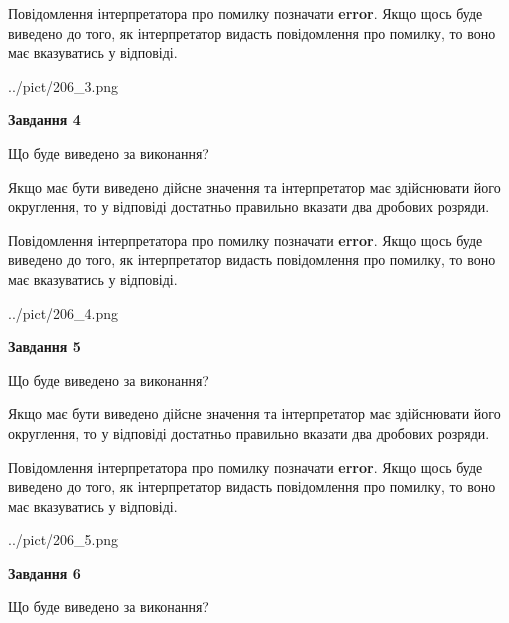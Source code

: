 \documentclass[12pt, ukrainian]{article}
\begin{document}
{\begin {Large}
Повідомлення інтерпретатора про помилку позначати \textbf{error}.
Якщо щось буде виведено до того, як інтерпретатор видасть повідомлення про помилку, 
то воно має вказуватись у відповіді. \par

\begin{center}
	{../pict/206_3.png}
\end{center}
\newpage

{\begin {center}\textbf{Завдання 4}\end {center}}\par
Що буде виведено за виконання? \par

Якщо має бути виведено дійсне значення та інтерпретатор має здійснювати його округлення, 
то у відповіді достатньо правильно вказати два дробових розряди.

Повідомлення інтерпретатора про помилку позначати \textbf{error}.
Якщо щось буде виведено до того, як інтерпретатор видасть повідомлення про помилку, 
то воно має вказуватись у відповіді. \par

\begin{center}
	{../pict/206_4.png}
\end{center}
\newpage

{\begin {center}\textbf{Завдання 5}\end {center}}\par
Що буде виведено за виконання? \par

Якщо має бути виведено дійсне значення та інтерпретатор має здійснювати його округлення, 
то у відповіді достатньо правильно вказати два дробових розряди.

Повідомлення інтерпретатора про помилку позначати \textbf{error}.
Якщо щось буде виведено до того, як інтерпретатор видасть повідомлення про помилку, 
то воно має вказуватись у відповіді. \par

\begin{center}
	{../pict/206_5.png}
\end{center}
\newpage

{\begin {center}\textbf{Завдання 6}\end {center}}\par
Що буде виведено за виконання? \par


\end{Large}}
\end{document}
